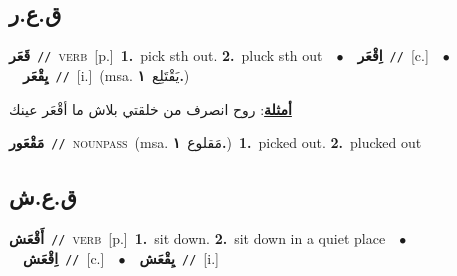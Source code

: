\documentclass[10pt,a4paper,twoside]{article} %
\begin{document}
\begin{multicols}{2}
\vspace{-3mm}
\subsection*{\color{blue}\foreignlanguage{arabic}{ق.ع.ر}\color{blue}{}} 

{\setlength\topsep{0pt}\textbf{\foreignlanguage{arabic}{قَعَر}}\ {\color{gray}\texttt{//}\color{black}}\ \textsc{verb}\ [p.]\ \textbf{1.}~pick sth out.  \textbf{2.}~pluck sth out\ \ $\bullet$\ \ \setlength\topsep{0pt}\textbf{\foreignlanguage{arabic}{اِقْعَر}}\ {\color{gray}\texttt{//}\color{black}}\ [c.]\ \ $\bullet$\ \ \setlength\topsep{0pt}\textbf{\foreignlanguage{arabic}{يِقْعَر}}\ {\color{gray}\texttt{//}\color{black}}\ [i.]\ \color{gray}(msa. \foreignlanguage{arabic}{يَقْتَلِع}~\foreignlanguage{arabic}{\textbf{١.}})\color{black}\  \begin{flushright}\color{gray}\foreignlanguage{arabic}{\textbf{\underline{\foreignlanguage{arabic}{أمثلة}}}: روح انصرف من خلقتي بلاش ما أقْعَر عينك}\end{flushright}\color{black}} \vspace{2mm}

{\setlength\topsep{0pt}\textbf{\foreignlanguage{arabic}{مَقْعَور}}\ {\color{gray}\texttt{//}\color{black}}\ \textsc{noun\textunderscore pass}\ \color{gray}(msa. \foreignlanguage{arabic}{مَقلوع}~\foreignlanguage{arabic}{\textbf{١.}})\color{black}\ \textbf{1.}~picked out.  \textbf{2.}~plucked out\ } \vspace{2mm}

\vspace{-3mm}
\subsection*{\color{blue}\foreignlanguage{arabic}{ق.ع.ش}\color{blue}{}} 

{\setlength\topsep{0pt}\textbf{\foreignlanguage{arabic}{أَقْعَش}}\ {\color{gray}\texttt{//}\color{black}}\ \textsc{verb}\ [p.]\ \textbf{1.}~sit down.  \textbf{2.}~sit down in a quiet place\ \ $\bullet$\ \ \setlength\topsep{0pt}\textbf{\foreignlanguage{arabic}{اِقْعَش}}\ {\color{gray}\texttt{//}\color{black}}\ [c.]\ \ $\bullet$\ \ \setlength\topsep{0pt}\textbf{\foreignlanguage{arabic}{يِقْعَش}}\ {\color{gray}\texttt{//}\color{black}}\ [i.]\ } \vspace{2mm}


\end{multicols}
\end{document}
